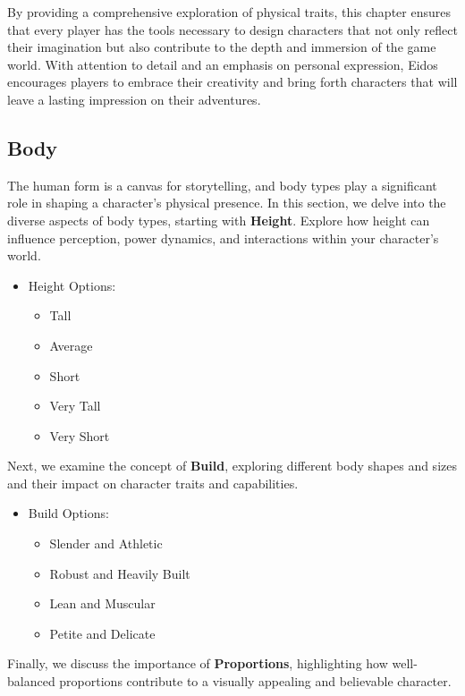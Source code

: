 \documentclass[12pt]{book}  %
\begin{document}
By providing a comprehensive exploration of physical traits, this chapter ensures that every player has the tools necessary to design characters that not only reflect their imagination but also contribute to the depth and immersion of the game world. With attention to detail and an emphasis on personal expression, Eidos encourages players to embrace their creativity and bring forth characters that will leave a lasting impression on their adventures.

\subsection{\textbf{Body}}

The human form is a canvas for storytelling, and body types play a significant role in shaping a character's physical presence. In this section, we delve into the diverse aspects of body types, starting with \textbf{Height}. Explore how height can influence perception, power dynamics, and interactions within your character's world.

\begin{itemize}
    \item Height Options:
    \begin{itemize}
        \item Tall
        \item Average
        \item Short
        \item Very Tall
        \item Very Short
    \end{itemize}
\end{itemize}

Next, we examine the concept of \textbf{Build}, exploring different body shapes and sizes and their impact on character traits and capabilities.

\begin{itemize}
    \item Build Options:
    \begin{itemize}
        \item Slender and Athletic
        \item Robust and Heavily Built
        \item Lean and Muscular
        \item Petite and Delicate
    \end{itemize}
\end{itemize}

Finally, we discuss the importance of \textbf{Proportions}, highlighting how well-balanced proportions contribute to a visually appealing and believable character.
\end{document}
